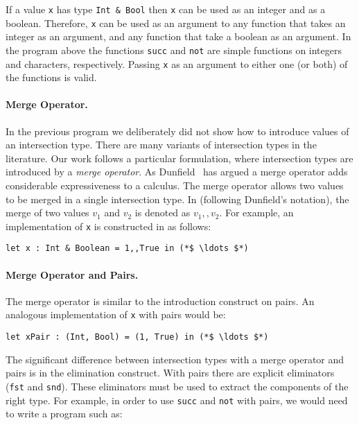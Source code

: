 \noindent If a value \lstinline{x} has type \lstinline{Int & Bool} then
\lstinline{x} can be used as an integer and as a boolean. Therefore,
\lstinline{x} can be used as an argument to any function that takes
an integer as an argument, and any
function that take a boolean as an argument. In the program above
the functions \lstinline{succ} and \lstinline{not} are 
simple functions on integers and characters, respectively.
Passing \lstinline{x} as an argument to either one (or both) of the
functions is valid.

\paragraph{Merge Operator.}
In the previous program we deliberately did not show how to introduce
values of an intersection type. There are many variants of
intersection types in the literature. Our work follows a particular
formulation, where intersection types are introduced by a \emph{merge
  operator}. 
As Dunfield~\cite{dunfield2014elaborating} has argued a
merge operator adds considerable expressiveness to a calculus. The
merge operator allows two values to be merged in a single intersection
type. In \name (following Dunfield's notation), the merge of two
values $v_1$ and $v_2$ is denoted as $v_1 ,, v_2$.  For example, an
implementation of \lstinline{x} is constructed in \name as follows:

\begin{lstlisting}
let x : Int & Boolean = 1,,True in (*$ \ldots $*)
\end{lstlisting}

\paragraph{Merge Operator and Pairs.}
The merge operator is similar to the introduction construct on pairs.
An analogous implementation of \lstinline{x} with pairs would be:

\begin{lstlisting}
let xPair : (Int, Bool) = (1, True) in (*$ \ldots $*)
\end{lstlisting}

\noindent The significant difference between intersection types with a
merge operator and pairs is in the elimination construct. With pairs
there are explicit eliminators (\lstinline{fst} and
\lstinline{snd}). These eliminators must be used to extract the
components of the right type. For example, in order to use
\lstinline{succ} and \lstinline{not} with pairs, we would need to
write a program such as:

